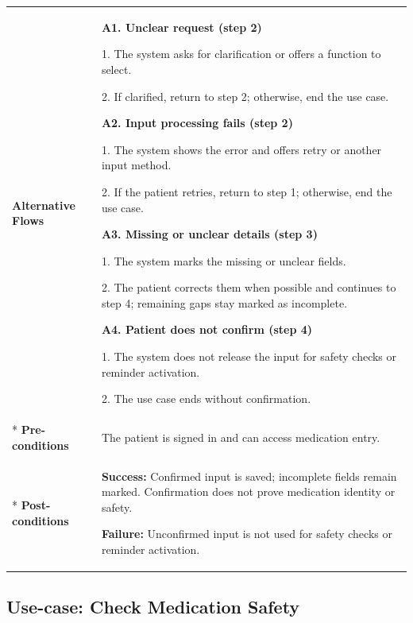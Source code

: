 \begin{longtable}{|p{}|p{}|}
\hline
\textbf{Alternative Flows} &
\textbf{A1. Unclear request (step 2)}\par
1. The system asks for clarification or offers a function to select.\par
2. If clarified, return to step 2; otherwise, end the use case.
\par
\textbf{A2. Input processing fails (step 2)}\par
1. The system shows the error and offers retry or another input method.\par
2. If the patient retries, return to step 1; otherwise, end the use case.
\par
\textbf{A3. Missing or unclear details (step 3)}\par
1. The system marks the missing or unclear fields.\par
2. The patient corrects them when possible and continues to step 4; remaining gaps stay marked as incomplete.
\par
\textbf{A4. Patient does not confirm (step 4)}\par
1. The system does not release the input for safety checks or reminder activation.\par
2. The use case ends without confirmation.
\\* \hline
\textbf{Pre-conditions} & The patient is signed in and can access medication entry. \\* \hline
\textbf{Post-conditions} & \textbf{Success:} Confirmed input is saved; incomplete fields remain marked. Confirmation does not prove medication identity or safety.\par
\textbf{Failure:} Unconfirmed input is not used for safety checks or reminder activation. \\ \hline
\end{longtable}

\clearpage
\subsection{Use-case: Check Medication Safety}
\label{uc:uc-03}


